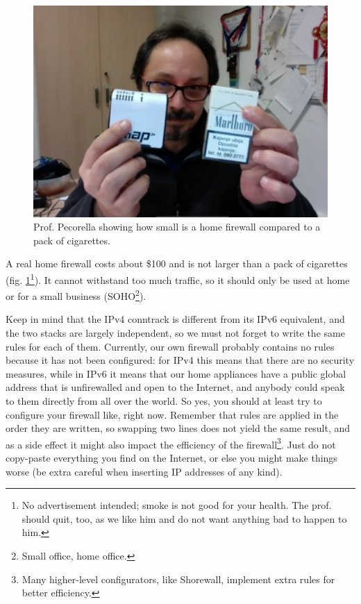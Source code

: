 \begin{figure}[h]
    \centering
    \includegraphics[scale=0.5]{img/fw_physical_cigarettes.png}
    \decoRule
    \caption{Prof. Pecorella showing how small is a home firewall compared to a pack of cigarettes.}
    \label{fig:fw_physical_cigarettes}
\end{figure}

A real home firewall costs about \$100 and is not larger than a pack of cigarettes (fig. \ref{fig:fw_physical_cigarettes}\footnote{No advertisement intended; smoke is not good for your health. The prof. should quit, too, as we like him and do not want anything bad to happen to him.}). It cannot withstand too much traffic, so it should only be used at home or for a small business (SOHO\footnote{Small office, home office.}).

Keep in mind that the IPv4 conntrack is different from its IPv6 equivalent, and the two stacks are largely independent, so we must not forget to write the same rules for each of them. Currently, our own firewall probably contains no rules because it has not been configured: for IPv4 this means that there are no security measures, while in IPv6 it means that our home appliances have a public global address that is unfirewalled and open to the Internet, and anybody could speak to them directly from all over the world. So yes, you should at least try to configure your firewall like, right now. Remember that rules are applied in the order they are written, so swapping two lines does not yield the same result, and as a side effect it might also impact the efficiency of the firewall\footnote{Many higher-level configurators, like Shorewall, implement extra rules for better efficiency.}. Just do not copy-paste everything you find on the Internet, or else you might make things worse (be extra careful when inserting IP addresses of any kind).

